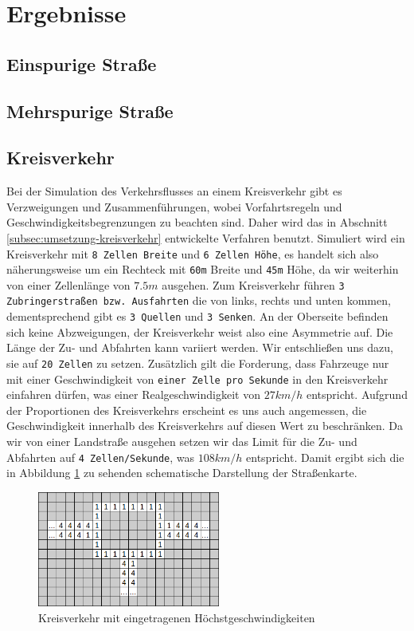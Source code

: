 \documentclass[11pt, a4paper]{article}
\begin{document}
\newpage
\section{Ergebnisse}
\label{sec:ergebnisse}
\subsection{Einspurige Straße}
\subsection{Mehrspurige Straße}
\subsection{Kreisverkehr}
Bei der Simulation des Verkehrsflusses an einem Kreisverkehr gibt es Verzweigungen und Zusammenführungen, wobei Vorfahrtsregeln und Geschwindigkeitsbegrenzungen zu beachten sind. Daher wird das in Abschnitt \ref{subsec:umsetzung-kreisverkehr} entwickelte Verfahren benutzt. Simuliert wird ein Kreisverkehr mit \texttt{8 Zellen Breite} und \texttt{6 Zellen Höhe}, es handelt sich also näherungsweise um ein Rechteck mit \texttt{60m} Breite und \texttt{45m} Höhe, da wir weiterhin von einer Zellenlänge von $7.5m$ ausgehen. Zum Kreisverkehr führen \texttt{3 Zubringerstraßen bzw. Ausfahrten} die von links, rechts und unten kommen, dementsprechend gibt es \texttt{3 Quellen} und \texttt{3 Senken}. An der Oberseite befinden sich keine Abzweigungen, der Kreisverkehr weist also eine Asymmetrie auf. Die Länge der Zu- und Abfahrten kann variiert werden. Wir entschließen uns dazu, sie auf \texttt{20 Zellen} zu setzen. Zusätzlich gilt die Forderung, dass Fahrzeuge nur mit einer Geschwindigkeit von \texttt{einer Zelle pro Sekunde} in den Kreisverkehr einfahren dürfen, was einer Realgeschwindigkeit von $27km/h$ entspricht. Aufgrund der Proportionen des Kreisverkehrs erscheint es uns auch angemessen, die Geschwindigkeit innerhalb des Kreisverkehrs auf diesen Wert zu beschränken. Da wir von einer Landstraße ausgehen setzen wir das Limit für die Zu- und Abfahrten auf \texttt{4 Zellen/Sekunde}, was $108km/h$ entspricht. Damit ergibt sich die in Abbildung \ref{fig:roundaboutSmall} zu sehenden schematische Darstellung der Straßenkarte.

\begin{figure}[h!]
	\centering
	\includegraphics[width=6cm]{img/roundaboutSmall}
	\caption{Kreisverkehr mit eingetragenen Höchstgeschwindigkeiten}
	\label{fig:roundaboutSmall}
\end{figure}
\end{document}
